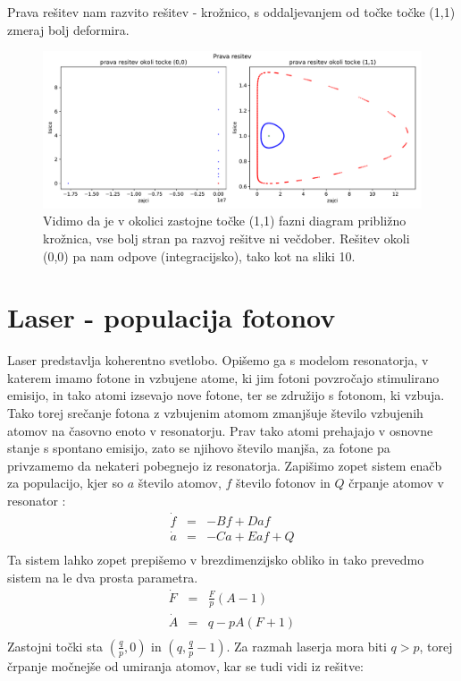 \documentclass[11pt, a4paper]{article}
\begin{document}
Prava rešitev nam razvito rešitev - krožnico, s oddaljevanjem od točke točke (1,1) zmeraj bolj deformira.
\begin{figure}[h]
  \centering
 
  \includegraphics[width=17cm]{zajci_stabilnost1_prava.pdf}
  \caption{Vidimo da je v okolici zastojne točke (1,1) fazni diagram približno krožnica, vse bolj stran pa razvoj rešitve ni večdober. Rešitev okoli (0,0) pa nam odpove (integracijsko), tako kot na sliki 10.}
\end{figure}


\section{Laser - populacija fotonov}
Laser predstavlja koherentno svetlobo. Opišemo ga s modelom resonatorja, v katerem imamo fotone in vzbujene atome, ki jim fotoni povzročajo stimulirano emisijo, in tako atomi izsevajo nove fotone, ter se združijo s fotonom, ki vzbuja. Tako torej srečanje fotona z vzbujenim atomom zmanjšuje število vzbujenih atomov na časovno enoto v resonatorju. Prav tako atomi prehajajo v osnovne stanje s spontano emisijo, zato se njihovo število manjša, za fotone pa privzamemo da nekateri pobegnejo iz resonatorja.  
Zapišimo zopet sistem enačb za populacijo, kjer so $a$ število atomov, $f$ število fotonov in $Q$ črpanje atomov v resonator : 
\begin{equation}
\begin{array} {lcl} \dot{f} & = & -B f + D a f \\
\dot{a}  & = & -Ca + E af + Q \\
 \end{array}
\end{equation}
Ta sistem lahko zopet prepišemo v brezdimenzijsko obliko in tako prevedmo sistem na le dva prosta parametra.
\begin{equation}
\begin{array} {lcl} \dot{F} & = & \frac{F}{p} (A-1) \\
\dot{A}  & = & q - p A (F+1) \\
 \end{array}
\end{equation}
Zastojni točki sta $(\frac{q}{p},0)$ in $(q, \frac{q}{p}-1)$.
Za razmah laserja mora biti $q > p$, torej črpanje močnejše od umiranja atomov, kar se tudi vidi iz rešitve:
\end{document}
